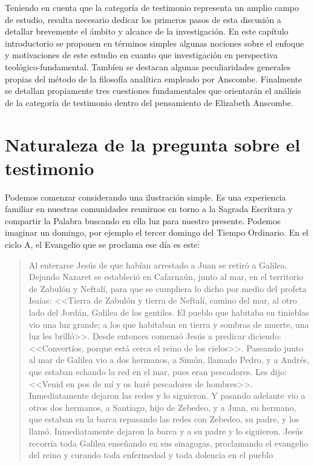 Teniendo en cuenta que la categoría de testimonio representa un amplio campo de estudio, resulta necesario dedicar los primeros pasos de esta discusión a detallar brevemente el ámbito y alcance de la investigación. En este capítulo introductorio se proponen en términos simples algunas nociones sobre el enfoque y motivaciones de este estudio en cuanto que investigación en perspectiva teológico-fundamental. Tambíen se destacan algunas peculiaridades generales propias del método de la filosofía analítica empleado por Anscombe. Finalmente se detallan propiamente tres cuestiones fundamentales que orientarán el análisis de la categoría de testimonio dentro del pensamiento de Elizabeth Anscombe.

\section{Naturaleza de la pregunta sobre el testimonio}

Podemos comenzar considerando una ilustración simple. Es una experiencia familiar en nuestras comunidades reunirnos en torno a la Sagrada Escritura y compartir la Palabra buscando en ella luz para nuestro presente. Podemos imaginar un domingo, por ejemplo el tercer domingo del Tiempo Ordinario. En el ciclo A, el Evangelio que se proclama ese día es este:
\blockquote[][\,(Mt~4,12-23)]{Al enterarse Jesús de que habían arrestado a Juan se retiró a Galilea. Dejando Nazaret se estableció en Cafarnaún, junto al mar, en el territorio de Zabulón y Neftalí, para que se cumpliera lo dicho por medio del profeta Isaías: <<Tierra de Zabulón y tierra de Neftalí, camino del mar, al otro lado del Jordán, Galilea de los gentiles. El pueblo que habitaba en tinieblas vio una luz grande; a los que habitaban en tierra y sombras de muerte, una luz les brilló>>. Desde entonces comenzó Jesús a predicar diciendo: <<Convertíos, porque está cerca el reino de los cielos>>. Paseando junto al mar de Galilea vio a dos hermanos, a Simón, llamado Pedro, y a Andrés, que estaban echando la red en el mar, pues eran pescadores. Les dijo: <<Venid en pos de mí y os haré pescadores de hombres>>. Inmediatamente dejaron las redes y lo siguieron. Y pasando adelante vio a otros dos hermanos, a Santiago, hijo de Zebedeo, y a Juan, su hermano, que estaban en la barca repasando las redes con Zebedeo, su padre, y los llamó. Inmediatamente dejaron la barca y a su padre y lo siguieron. Jesús recorría toda Galilea enseñando en sus sinagogas, proclamando el evangelio del reino y curando toda enfermedad y toda dolencia en el pueblo}.


